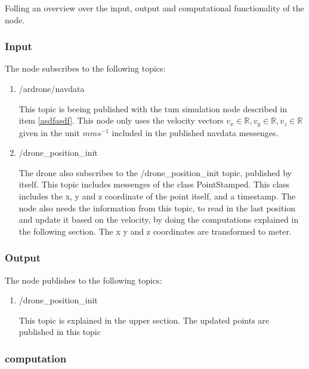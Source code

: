 	
	Folling an overview over the input, output and computational functionality of the node. 
	
	\subsubsection{Input}
	
	The node subscribes to the following topics:
	
	\begin{enumerate}
	\item{/ardrone/navdata}
	
	This topic is beeing published with the tum simulation node described in item \ref{asdfasdf}.
	This node only uses the velocity vectors
	$v_x \in \mathbb{R}, v_y \in \mathbb{R}, v_z \in \mathbb{R}$ given in the unit $mms^{-1}$ included in the published navdata messenges. 
	
	\item{/drone\_position\_init}
	
	The drone also subscribes to the /drone\_position\_init topic, published by itself. This topic includes messenges of the class PointStamped. 
	This class includes the x, y and z coordinate of the point itself, and a timestamp.  
	The node also needs the information from this topic, 
	to read in the last position and update it based on the velocity, by doing the computations explained in the following section. The x y and z 
	coordinates are transformed to meter. 
	\end{enumerate}
	
	\subsubsection{Output}
	
	The node publishes to the following topics:
	
	\begin{enumerate}
	\item{/drone\_position\_init}
	
	This topic is explained in the upper section. The updated points are published in this topic
	
	\end{enumerate}
	
	\subsubsection{computation}
	
